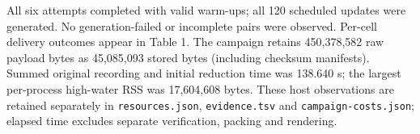 All six attempts completed with valid warm-ups; all 120 scheduled updates were generated. No generation-failed or incomplete pairs were observed. Per-cell delivery outcomes appear in Table 1. The campaign retains 450,378,582 raw payload bytes as 45,085,093 stored bytes (including checksum manifests). Summed original recording and initial reduction time was 138.640 s; the largest per-process high-water RSS was 17,604,608 bytes. These host observations are retained separately in \texttt{resources.json}, \texttt{evidence.tsv} and \texttt{campaign-costs.json}; elapsed time excludes separate verification, packing and rendering.
